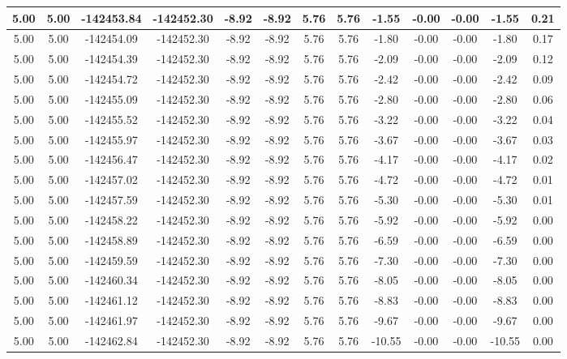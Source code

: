 \begin{table}[htbp]
\begin{adjustbox}{angle=90}
\begin{tabular}{|c|c|c|c|c|c|c|c|c|c|c|c|c|}
 5.00 & 5.00 & -142453.84 & -142452.30 & -8.92 & -8.92 & 5.76 & 5.76 & -1.55 & -0.00 & -0.00 & -1.55 & 0.21\\ \hline
 5.00 & 5.00 & -142454.09 & -142452.30 & -8.92 & -8.92 & 5.76 & 5.76 & -1.80 & -0.00 & -0.00 & -1.80 & 0.17\\ \hline
 5.00 & 5.00 & -142454.39 & -142452.30 & -8.92 & -8.92 & 5.76 & 5.76 & -2.09 & -0.00 & -0.00 & -2.09 & 0.12\\ \hline
 5.00 & 5.00 & -142454.72 & -142452.30 & -8.92 & -8.92 & 5.76 & 5.76 & -2.42 & -0.00 & -0.00 & -2.42 & 0.09\\ \hline
 5.00 & 5.00 & -142455.09 & -142452.30 & -8.92 & -8.92 & 5.76 & 5.76 & -2.80 & -0.00 & -0.00 & -2.80 & 0.06\\ \hline
 5.00 & 5.00 & -142455.52 & -142452.30 & -8.92 & -8.92 & 5.76 & 5.76 & -3.22 & -0.00 & -0.00 & -3.22 & 0.04\\ \hline
 5.00 & 5.00 & -142455.97 & -142452.30 & -8.92 & -8.92 & 5.76 & 5.76 & -3.67 & -0.00 & -0.00 & -3.67 & 0.03\\ \hline
 5.00 & 5.00 & -142456.47 & -142452.30 & -8.92 & -8.92 & 5.76 & 5.76 & -4.17 & -0.00 & -0.00 & -4.17 & 0.02\\ \hline
 5.00 & 5.00 & -142457.02 & -142452.30 & -8.92 & -8.92 & 5.76 & 5.76 & -4.72 & -0.00 & -0.00 & -4.72 & 0.01\\ \hline
 5.00 & 5.00 & -142457.59 & -142452.30 & -8.92 & -8.92 & 5.76 & 5.76 & -5.30 & -0.00 & -0.00 & -5.30 & 0.01\\ \hline
 5.00 & 5.00 & -142458.22 & -142452.30 & -8.92 & -8.92 & 5.76 & 5.76 & -5.92 & -0.00 & -0.00 & -5.92 & 0.00\\ \hline
 5.00 & 5.00 & -142458.89 & -142452.30 & -8.92 & -8.92 & 5.76 & 5.76 & -6.59 & -0.00 & -0.00 & -6.59 & 0.00\\ \hline
 5.00 & 5.00 & -142459.59 & -142452.30 & -8.92 & -8.92 & 5.76 & 5.76 & -7.30 & -0.00 & -0.00 & -7.30 & 0.00\\ \hline
 5.00 & 5.00 & -142460.34 & -142452.30 & -8.92 & -8.92 & 5.76 & 5.76 & -8.05 & -0.00 & -0.00 & -8.05 & 0.00\\ \hline
 5.00 & 5.00 & -142461.12 & -142452.30 & -8.92 & -8.92 & 5.76 & 5.76 & -8.83 & -0.00 & -0.00 & -8.83 & 0.00\\ \hline
 5.00 & 5.00 & -142461.97 & -142452.30 & -8.92 & -8.92 & 5.76 & 5.76 & -9.67 & -0.00 & -0.00 & -9.67 & 0.00\\ \hline
 5.00 & 5.00 & -142462.84 & -142452.30 & -8.92 & -8.92 & 5.76 & 5.76 & -10.55 & -0.00 & -0.00 & -10.55 & 0.00\\ \hline

\end{tabular}
\end{adjustbox}
\end{table}
